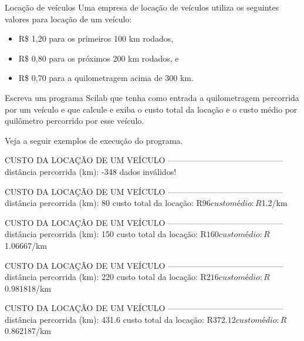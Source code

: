 \documentclass[11pt,fleqn]{practice}
\begin{document}
\begin{task}[breakable]{Locação de veículos}{}
  Uma empresa de locação de veículos utiliza os seguintes valores para
  locação de um veículo:
  \begin{itemize}
    \item R\$ 1,20 para os primeiros 100 km rodados,
    \item R\$ 0,80 para os próximos 200 km rodados, e
    \item R\$ 0,70 para a quilometragem acima de 300 km.
  \end{itemize}
  Escreva um programa Scilab que tenha como entrada a quilometragem
  percorrida por um veículo e que calcule e exiba o custo total da
  locação e o custo médio por quilômetro percorrido por esse veículo.

  Veja a seguir exemplos de execução do programa.

  \begin{runexample}
CUSTO DA LOCAÇÃO DE UM VEÍCULO
------------------------------------------
distância percorrida (km): -348
dados inválidos!
  \end{runexample}

  \begin{runexample}
CUSTO DA LOCAÇÃO DE UM VEÍCULO
------------------------------------------
distância percorrida (km): 80
custo total da locação: R$96
custo médio: R$1.2/km
  \end{runexample}

  \begin{runexample}
CUSTO DA LOCAÇÃO DE UM VEÍCULO
------------------------------------------
distância percorrida (km): 150
custo total da locação: R$160
custo médio: R$1.06667/km
  \end{runexample}

  \begin{runexample}
CUSTO DA LOCAÇÃO DE UM VEÍCULO
------------------------------------------
distância percorrida (km): 220
custo total da locação: R$216
custo médio: R$0.981818/km
  \end{runexample}

  \begin{runexample}
CUSTO DA LOCAÇÃO DE UM VEÍCULO
------------------------------------------
distância percorrida (km): 431.6
custo total da locação: R$372.12
custo médio: R$0.862187/km
  \end{runexample}

  \tcblower
  \solution
\end{task}
\end{document}
